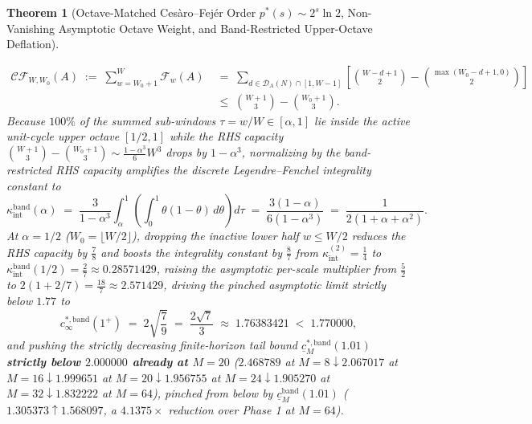 \documentclass[11pt,reqno]{amsart}
\newtheorem{theorem}{Theorem}[section]
\theoremstyle{definition}
\theoremstyle{remark}
\begin{document}
\begin{theorem}[Octave-Matched Ces\`aro--Fej\'er Order $p^*(s) \sim 2^s \ln 2$, Non-Vanishing Asymptotic Octave Weight, and Band-Restricted Upper-Octave Deflation]
\begin{enumerate}
\begin{equation}
    \begin{aligned}
      \mathcal{CF}_{W, W_0}(A) \;:=\; \sum_{w = W_0 + 1}^W \mathcal{F}_w(A) &\;=\; \sum_{d \in \mathcal{D}_A(N) \cap [1, W - 1]} \left[\binom{W - d + 1}{2} - \binom{\max(W_0 - d + 1, 0)}{2}\right] \\
      &\;\le\; \binom{W + 1}{3} - \binom{W_0 + 1}{3}.
    \end{aligned}
  \end{equation}
  Because $100\%$ of the summed sub-windows $\tau = w/W \in [\alpha, 1]$ lie inside the active unit-cycle upper octave $[1/2, 1]$ while the RHS capacity $\binom{W+1}{3} - \binom{W_0+1}{3} \sim \frac{1 - \alpha^3}{6}W^3$ drops by $1 - \alpha^3$, normalizing by the band-restricted RHS capacity amplifies the discrete Legendre--Fenchel integrality constant to
  \begin{equation}\label{eq:kappa_int_band}
    \kappa_{\mathrm{int}}^{\mathrm{band}}(\alpha) \;=\; \frac{3}{1 - \alpha^3} \int_\alpha^1 \left(\int_0^1 \theta(1 - \theta)\,d\theta\right) d\tau \;=\; \frac{3(1 - \alpha)}{6(1 - \alpha^3)} \;=\; \frac{1}{2(1 + \alpha + \alpha^2)}.
  \end{equation}
  At $\alpha = 1/2$ ($W_0 = \lfloor W/2 \rfloor$), dropping the inactive lower half $w \le W/2$ reduces the RHS capacity by $\frac{7}{8}$ and boosts the integrality constant by $\frac{8}{7}$ from $\kappa_{\mathrm{int}}^{(2)} = \frac{1}{4}$ to $\kappa_{\mathrm{int}}^{\mathrm{band}}(1/2) = \frac{2}{7} \approx 0.28571429$, raising the asymptotic per-scale multiplier from $\frac{5}{2}$ to $2(1 + 2/7) = \frac{18}{7} \approx 2.571429$, driving the pinched asymptotic limit strictly below $1.77$ to
  \begin{equation}\label{eq:c_infty_band}
    c_\infty^{*,\mathrm{band}}(1^+) \;=\; 2\sqrt{\frac{7}{9}} \;=\; \frac{2\sqrt{7}}{3} \;\approx\; 1.76383421 \;<\; 1.770000,
  \end{equation}
  and pushing the strictly decreasing finite-horizon tail bound $\underline{c}_M^{*,\mathrm{band}}(1.01)$ \textbf{strictly below $2.000000$ already at $M = 20$} ($2.468789$ at $M=8 \downarrow 2.067017$ at $M=16 \downarrow \mathbf{1.999651}$ at $M=20 \downarrow 1.956755$ at $M=24 \downarrow 1.905270$ at $M=32 \downarrow \mathbf{1.832222}$ at $M=64$), pinched from below by $\underline{c}_M^{\mathrm{band}}(1.01)$ ($1.305373 \uparrow 1.568097$, a $4.1375\times$ reduction over Phase 1 at $M=64$).
\end{enumerate}
\end{theorem}
\end{document}

